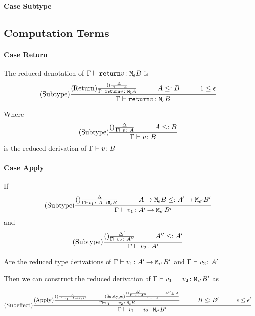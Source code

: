 {    \paragraph{Case Subtype}


    \subsection{Computation Terms}
    \paragraph{Case Return}
    The reduced denotation of $\Gamma \vdash \texttt{return} v \colon \texttt{M}_{\epsilon}{B}$ is 
    $$
        \treerule{Subtype}
        {
            \treerule{Return}
            {\treerule{}{\D}{\gtyperelation{v}{A}}}
            {\gtyperelation{\return{v}}{\moa}}
            \s\s
            A \subtype B
            \s\s
            \1 \subeffect \e
        }
        {\gtyperelation{\return{v}}{\meb}}
    $$

    Where $$\deltavrule{\G}{v}{A}{B}$$ is the reduced derivation of $\Gamma \vdash v \colon B$
    
    \paragraph{Case Apply}
    If 
    $$
        \deltavrule{\G}{v_1}{\aeb}{\lamtype{A'}{\e'}{B'}}
    $$ and $$
        \deltavruleprime{\G}{v_2}{A''}{A'}
    $$

    Are the reduced type derivations of $\Gamma \vdash v_1 \colon A' \rightarrow \texttt{M}_{\epsilon'}{B'}$ and $\Gamma \vdash v_2 \colon A'$



    Then we can construct the reduced derivation of $\gtyperelation{\apply{v_1}{v_2}}{\M{\e'}{B'}}$ as

    $$
        \treerule{Subeffect}{
            \treerule{Apply}{
                \treerule{}{\D}{
                    \gtyperelation{v_1}{\aeb}
                }
                \s\s
                \treerule{Subtype}{
                    \treerule{}{\D'}{
                        \gtyperelation{v}{A''}
                    } \s\s A'' \subtype A
                }
                {\gtyperelation{v}{A}}
            }{
                \gtyperelation{\apply{v_1}{v_2}}{\meb}
            }
            \s\s
            B \subtype B'
            \s\s
            \e \subeffect \e'
        }{
            \gtyperelation{\apply{v_1}{v_2}}{\M{\e'}{B'}}
        }
    $$
}
